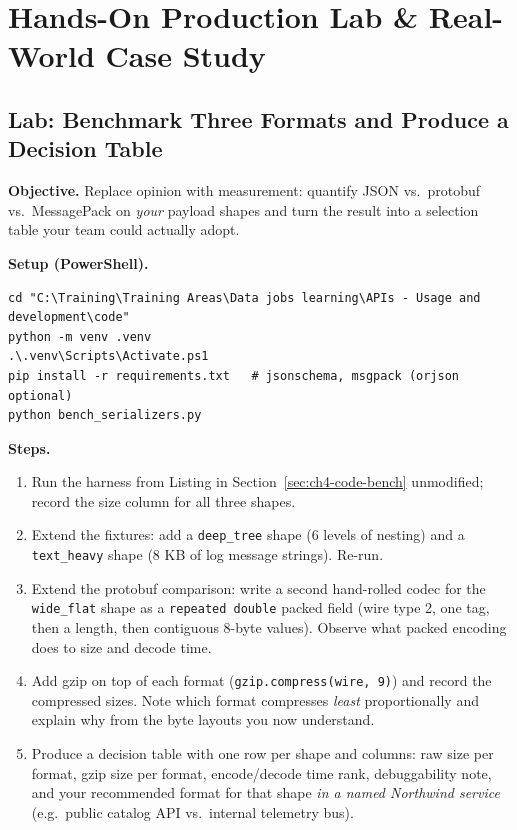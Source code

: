 \section{Hands-On Production Lab \& Real-World Case Study}
\label{sec:ch4-lab}

\subsection{Lab: Benchmark Three Formats and Produce a Decision Table}

\textbf{Objective.} Replace opinion with measurement: quantify JSON vs.\ protobuf
vs.\ MessagePack on \emph{your} payload shapes and turn the result into a selection
table your team could actually adopt.

\textbf{Setup (PowerShell).}
\begin{verbatim}
cd "C:\Training\Training Areas\Data jobs learning\APIs - Usage and development\code"
python -m venv .venv
.\.venv\Scripts\Activate.ps1
pip install -r requirements.txt   # jsonschema, msgpack (orjson optional)
python bench_serializers.py
\end{verbatim}

\textbf{Steps.}
\begin{enumerate}
  \item Run the harness from Listing in Section~\ref{sec:ch4-code-bench} unmodified;
        record the size column for all three shapes.
  \item Extend the fixtures: add a \texttt{deep\_tree} shape (6 levels of nesting)
        and a \texttt{text\_heavy} shape (8 KB of log message strings). Re-run.
  \item Extend the protobuf comparison: write a second hand-rolled codec for the
        \texttt{wide\_flat} shape as a \texttt{repeated double} packed field (wire
        type 2, one tag, then a length, then contiguous 8-byte values). Observe
        what packed encoding does to size and decode time.
  \item Add gzip on top of each format (\texttt{gzip.compress(wire, 9)}) and record
        the compressed sizes. Note which format compresses \emph{least} proportionally
        and explain why from the byte layouts you now understand.
  \item Produce a decision table with one row per shape and columns: raw size per
        format, gzip size per format, encode/decode time rank, debuggability note,
        and your recommended format for that shape \emph{in a named Northwind
        service} (e.g.\ public catalog API vs.\ internal telemetry bus).
\end{enumerate}

